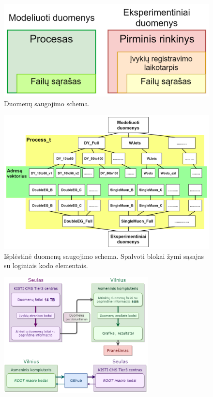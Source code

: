 \documentclass[a4paper, 12pt, twoside]{article}
\begin{document}
\begin{figure}[H]
	\includegraphics[width=\textwidth]{Duomenu_schema_DataMC_v2.png}
	\caption{\label{fig:duomSchem} Duomenų saugojimo schema.}
\end{figure}

\begin{figure}[H]
	\includegraphics[width=\textwidth]{medis_praplestas_spalvotas.png}
	\caption{\label{fig:duomKod} Išplėstinė duomenų saugojimo schema. Spalvoti blokai žymi sąsajas su loginiais
	kodo elementais.}
\end{figure}

\begin{figure}[H]
	\includegraphics[width=0.7\textwidth]{Duomenu_panaudojimo_schema.png}
\end{figure}
\end{document}
